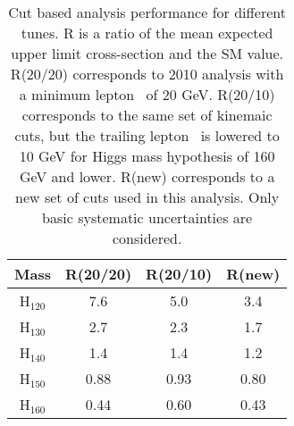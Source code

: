 \begin{table}[!ht]
  \begin{center}
 {\small
  \begin{tabular} {|c|c|c|c|}
  \hline
  Mass   &  R(20/20) & R(20/10) & R(new) \\
  \hline
  H$_{120}$ & 7.6 & 5.0 & 3.4 \\
  H$_{130}$ & 2.7 & 2.3 & 1.7 \\
  H$_{140}$ & 1.4 & 1.4 & 1.2 \\
  H$_{150}$ & 0.88 & 0.93 & 0.80 \\
  H$_{160}$ & 0.44 & 0.60 & 0.43 \\
  \hline
  \end{tabular}
  }
  \caption{Cut based analysis performance for different tunes. R is a ratio of the mean
   expected upper limit cross-section and the SM value.  R(20/20) corresponds 
  to 2010 analysis with a minimum lepton \pt\ of 20 GeV. R(20/10) corresponds to the same 
  set of kinemaic cuts, but the trailing lepton \pt\ is lowered to 10 GeV for Higgs mass hypothesis 
  of 160 GeV and lower. R(new) corresponds to a new set of cuts used in this analysis. Only 
  basic systematic uncertainties are considered.}
   \label{tab:cutanalysis_perf}
  \end{center}
\end{table}


